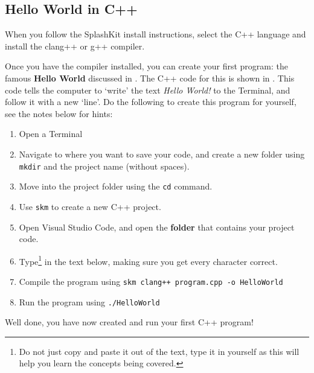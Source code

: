 \subsection{Hello World in C++} %
\label{sub:hello_world_in_c}

When you follow the SplashKit install instructions, select the C++ language and install the clang++ or g++ compiler.

Once you have the compiler installed, you can create your first program: the famous \textbf{Hello World} discussed in . The C++ code for this is shown in . This code tells the computer to `write' the text \emph{Hello World!} to the Terminal, and follow it with a new `line'. Do the following to create this program for yourself, see the notes below for hints:

\begin{enumerate}
  \item Open a Terminal
  \item Navigate to where you want to save your code, and create a new folder using \texttt{mkdir} and the project name (without spaces).
  \item Move into the project folder using the \texttt{cd} command.
  \item Use \texttt{skm} to create a new C++ project.
  \item Open Visual Studio Code, and open the \textbf{folder} that contains your project code.
  \item Type\footnote{Do not just copy and paste it out of the text, type it in yourself as this will help you learn the concepts being covered.} in the text below, making sure you get every character correct.
  \item Compile the program using \texttt{skm clang++ program.cpp -o HelloWorld}
  \item Run the program using \texttt{./HelloWorld}
\end{enumerate}

Well done, you have now created and run your first C++ program!

\csection
{
}


